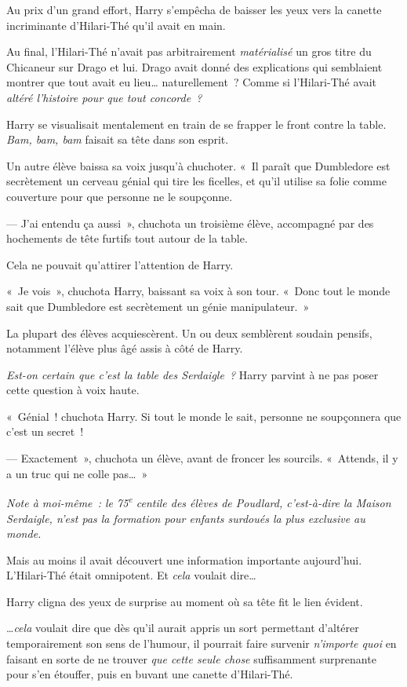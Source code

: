 Au prix d'un grand effort, Harry s'empêcha de baisser les yeux vers la canette incriminante d'Hilari-Thé qu'il avait en main.

Au final, l'Hilari-Thé n'avait pas arbitrairement \emph{matérialisé} un gros titre du Chicaneur sur Drago et lui.
Drago avait donné des explications qui semblaient montrer que tout avait eu lieu… naturellement~?
Comme si l'Hilari-Thé avait \emph{altéré l'histoire pour que tout concorde~?}

Harry se visualisait mentalement en train de se frapper le front contre la table.
\emph{Bam, bam, bam} faisait sa tête dans son esprit.

Un autre élève baissa sa voix jusqu'à chuchoter.
«~Il paraît que Dumbledore est secrètement un cerveau génial qui tire les ficelles, et qu'il utilise sa folie comme couverture pour que personne ne le soupçonne.

--- J'ai entendu ça aussi~», chuchota un troisième élève, accompagné par des hochements de tête furtifs tout autour de la table.

Cela ne pouvait qu'attirer l'attention de Harry.

«~Je vois~», chuchota Harry, baissant sa voix à son tour.
«~Donc tout le monde sait que Dumbledore est secrètement un génie manipulateur.~»

La plupart des élèves acquiescèrent.
Un ou deux semblèrent soudain pensifs, notamment l'élève plus âgé assis à côté de Harry.

\emph{Est-on certain que c'est la table des Serdaigle~?}
Harry parvint à ne pas poser cette question à voix haute.

«~Génial~! chuchota Harry. Si tout le monde le sait, personne ne soupçonnera que c'est un secret~!

--- Exactement~», chuchota un élève, avant de froncer les sourcils.
«~Attends, il y a un truc qui ne colle pas…~»

\emph{Note à moi-même~: le 75\textsuperscript{e} centile des élèves de Poudlard, c'est-à-dire la Maison Serdaigle, n'est pas la formation pour enfants surdoués la plus exclusive au monde.}

Mais au moins il avait découvert une information importante aujourd'hui.
L'Hilari-Thé était omnipotent.
Et \emph{cela} voulait dire…

Harry cligna des yeux de surprise au moment où sa tête fit le lien évident.

…\emph{cela} voulait dire que dès qu'il aurait appris un sort permettant d'altérer temporairement son sens de l'humour, il pourrait faire survenir \emph{n'importe quoi} en faisant en sorte de ne trouver \emph{que cette seule chose} suffisamment surprenante pour s'en étouffer, puis en buvant une canette d'Hilari-Thé.

